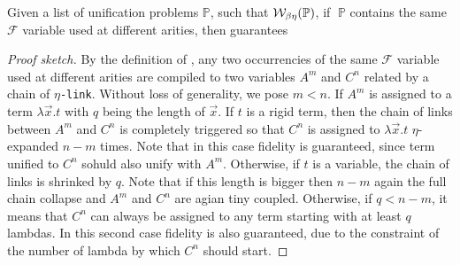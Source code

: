 \documentclass[sigconf,natbib=false,review]{acmart}
\newcommand{\appsep}{\ensuremath{\textcolor{lightgray}{\cdot}}}
\newcommand{\linkMacro}[1]{\ensuremath{#1}\texttt{-link}\xspace}
\newcommand{\linketa} {\linkMacro{\eta}}
\newcommand{\Fo}{\texorpdfstring{\ensuremath{\mathcal{F}\xspace}}{F}} %
\newcommand{\foUnifPb}{\ensuremath{\mathbb{P}}\xspace}
\begin{document}
\begin{theorem}
  Given a list of unification problems \foUnifPb, such that 
  $\wellb_{\beta \eta}(\foUnifPb)$,
  if $\;\foUnifPb$ contains the same \Fo{} variable used at different arities,
  then \mapdeduplication guarantees 
\end{theorem}

\begin{proof}[Proof sketch]
  By the definition of \mapdeduplication, any two occurrencies of the same \Fo{} 
  variable used at different arities are compiled to two
  variables $A^m$ and $C^n$ related by a chain of \linketa.
%
  Without loss of generality, we pose $m < n$. If $A^m$ is assigned to a term
  $\lambda \vec{x}.t$ with $q$ being the length of $\vec{x}$. If $t$ is a rigid
  term, then the chain of links between $A^m$ and $C^n$ is completely triggered
  so that $C^n$ is assigned to $\lambda \vec{x}.t$ $\eta$-expanded $n-m$ times.
  Note that in this case fidelity is guaranteed, since term unified to $C^n$
  sohuld also unify with $A^m$. Otherwise, if $t$ is a variable, the chain of
  links is shrinked by $q$. Note that if this length is bigger then $n-m$ again
  the full chain collapse and $A^m$ and $C^n$ are agian tiny coupled. Otherwise,
  if $q < n-m$, it means that $C^n$ can always be assigned to any term starting
  with at least $q$ lambdas. In this second case fidelity is also guaranteed,
  due to the constraint of the number of lambda by which $C^n$ should start.
%
%
%
\end{proof}
\end{document}
